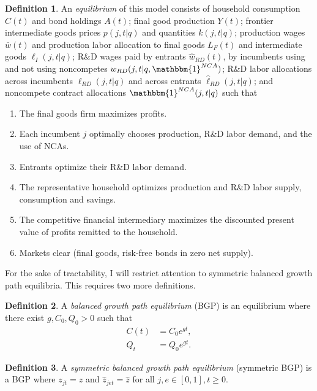 \documentclass[11pt,english]{article}
\theoremstyle{definition}
\newtheorem{definition}{Definition}
\begin{document}
\theoremstyle{definition}
\begin{definition}
	An \emph{equilibrium} of this model consists of household consumption $C(t)$ and bond holdings $A(t)$; final good production $Y(t)$; frontier intermediate goods prices $p(j,t|q)$ and quantities $k(j,t|q)$; production wages $\bar{w}(t)$ and production labor allocation to final goods $L_{F}(t)$ and intermediate goods $\ell_I(j,t|q)$; R\&D wages paid by entrants $\hat{w}_{RD}(t)$, by incumbents using and not using noncompetes $w_{RD}(j,t|q,\mathbbm{1}^{NCA})$; R\&D labor allocations across incumbents $\ell_{RD}(j,t|q)$ and across entrants $\hat{\ell}_{RD}(j,t|q)$; and noncompete contract allocations $\mathbbm{1}^{NCA}(j,t|q)$ such that 
	\begin{enumerate}
		\item The final goods firm maximizes profits.
		\item Each incumbent $j$ optimally chooses production, R\&D labor demand, and the use of NCAs.
		\item Entrants optimize their R\&D labor demand.
		\item The representative household optimizes production and R\&D labor supply, consumption and savings.
		\item The competitive financial intermediary maximizes the discounted present value of profits remitted to the household.
		\item Markets clear (final goods, risk-free bonds in zero net supply).
	\end{enumerate}
\end{definition}

For the sake of tractability, I will restrict attention to symmetric balanced growth path equilibria. This requires two more definitions.

\theoremstyle{definition}
\begin{definition}
	A \emph{balanced growth path equilibrium} (BGP) is an equilibrium where there exist $g, C_0, Q_0 > 0$ such that
	\begin{align*}
		C(t) &= C_0 e^{gt}, \\
		Q_t &= Q_0 e^{gt}.
	\end{align*}
\end{definition}

\theoremstyle{definition}
\begin{definition}
	A \emph{symmetric balanced growth path equilibrium} (symmetric BGP) is a BGP where $z_{jt} = z$ and $\hat{z}_{jet} = \hat{z}$ for all $j,e \in [0,1], t \ge 0$. 
\end{definition}
\end{document}
